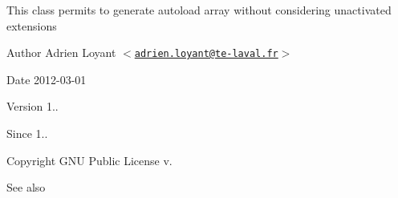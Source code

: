 \-This class permits to generate autoload array without considering unactivated extensions

\begin{DoxyAuthor}{\-Author}
\-Adrien \-Loyant $<$\href{mailto:adrien.loyant@te-laval.fr}{\tt adrien.\-loyant@te-\/laval.\-fr}$>$
\end{DoxyAuthor}
\begin{DoxyDate}{\-Date}
2012-\/03-\/01 
\end{DoxyDate}
\begin{DoxyVersion}{\-Version}
1.. 
\end{DoxyVersion}
\begin{DoxySince}{\-Since}
1.. 
\end{DoxySince}
\begin{DoxyCopyright}{\-Copyright}
\-G\-N\-U \-Public \-License v.
\end{DoxyCopyright}
\begin{DoxySeeAlso}{\-See also}

\end{DoxySeeAlso}
